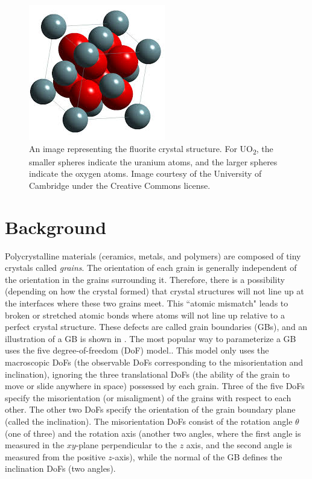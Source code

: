 \documentclass[twoside,senior]{BYUPhys}
\begin{document}
\begin{figure}[ht!]
\centering
\includegraphics[scale=1.0]{Images/UO2}
\caption[Example of the fluorite crystal structure.]{\label{fig:uo2Lattice}An image representing the fluorite crystal structure.  For UO\textsubscript{2}, the smaller spheres indicate the uranium atoms, and the larger spheres indicate the oxygen atoms.  Image courtesy of the University of Cambridge under the Creative Commons license.}
\end{figure}

\section{Background\label{intro:background}}
Polycrystalline materials (ceramics, metals, and polymers) are composed of tiny crystals called \emph{grains}.  The orientation of each grain is generally independent of the orientation in the grains surrounding it. Therefore, there is a possibility (depending on how the crystal formed\cite{callister2003}) that crystal structures will not line up at the interfaces where these two grains meet.  This ``atomic mismatch"\cite{callister2003} leads to broken or stretched atomic bonds where atoms will not line up relative to a perfect crystal structure.  These defects are called grain boundaries (GBs), and an illustration of a GB is shown in . The most popular way to parameterize a GB uses the five degree-of-freedom (DoF) model.\cite{patala2013, lejcek2010, homer2015, bulatov2014, harbison2015, rohrer2011}.  This model only uses the macroscopic DoFs (the observable DoFs corresponding to the misorientation and inclination), ignoring the three translational DoFs (the ability of the grain to move or slide anywhere in space) possessed by each grain.  Three of the five DoFs specify the misorientation (or misaligment) of the grains with respect to each other.  The other two DoFs specify the orientation of the grain boundary plane (called the inclination).  The misorientation DoFs consist of the rotation angle $\theta$ (one of three) and the rotation axis (another two angles, where the first angle is measured in the $xy$-plane perpendicular to the $z$ axis, and the second angle is measured from the positive $z$-axis), while the normal of the GB defines the inclination DoFs (two angles).\cite{lejcek2010}
\end{document}
